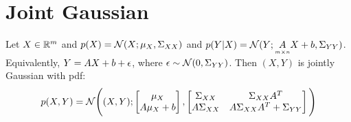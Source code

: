 \section{Joint Gaussian}
Let $X \in \mathbb{R}^m$ and $p(X) = \mathcal{N}(X; \mu_X, \Sigma_{XX})$ and $p(Y|X) = \mathcal{N}(Y; \underset{\scriptscriptstyle m \times n}{A} X + b, \Sigma_{YY})$. Equivalently, $Y = A X + b + \epsilon$, where $\epsilon \sim \mathcal{N}(0, \Sigma_{YY})$. Then $(X, Y)$ is jointly Gaussian with pdf:
\begin{align}
	p(X, Y) = \mathcal{N}\Bigg((X, Y); \begin{bmatrix}\mu_X \\ A \mu_X + b \end{bmatrix}, 
	                            \begin{bmatrix}\Sigma_{XX} &  \Sigma_{XX} A^T \\ A \Sigma_{XX} & A \Sigma_{XX} A^T + \Sigma_{YY} \end{bmatrix} \Bigg
	                            )
\end{align}
